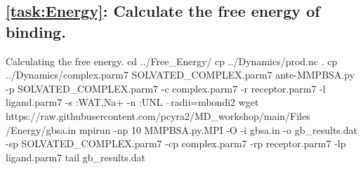     \subsection{\cref{task:Energy}: Calculate the free energy of binding.}
    \begin{bashcmd}[label=cmd:task7]{Calculating the free energy.}
    cd ../Free_Energy/
    cp ../Dynamics/prod.nc .
    cp ../Dynamics/complex.parm7 SOLVATED_COMPLEX.parm7
    ante-MMPBSA.py -p SOLVATED_COMPLEX.parm7 -c complex.parm7 -r receptor.parm7 -l ligand.parm7 -s :WAT,Na+ -n :UNL --radii=mbondi2
    wget https://raw.githubusercontent.com/pcyra2/MD_workshop/main/Files /Energy/gbsa.in
    mpirun -np 10 MMPBSA.py.MPI -O -i gbsa.in -o gb_results.dat -sp SOLVATED_COMPLEX.parm7 -cp complex.parm7 -rp receptor.parm7 -lp ligand.parm7
    tail gb_results.dat
    \end{bashcmd}